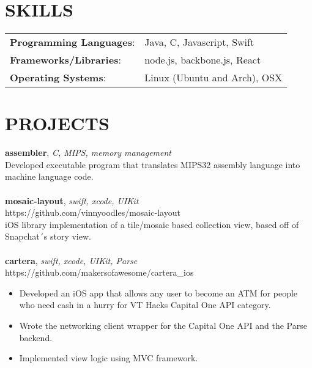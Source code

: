 \documentclass[line,margin]{res}
\begin{document}
\begin{resume}
	\section{SKILLS}
	\begin{tabular}{@{}ll}
		\textbf{Programming Languages}: & Java, C, Javascript, Swift   \\
		\textbf{Frameworks/Libraries}:  & node.js, backbone.js, React  \\
		\textbf{Operating Systems}:     & Linux (Ubuntu and Arch), OSX \\
	\end{tabular}
	\section{PROJECTS}
	\textbf{assembler}, {\sl C, MIPS, memory management}\\ Developed executable program that translates MIPS32 assembly language into machine language code.\\\\
	\textbf{mosaic-layout}, {\sl swift, xcode, UIKit}\\ https://github.com/vinnyoodles/mosaic-layout\\iOS library implementation of a tile/mosaic based collection view, based off of Snapchat´s story view.\\\\
	\textbf{cartera}, {\sl swift, xcode, UIKit, Parse}\\ https://github.com/makersofawesome/cartera\_ios\\\begin{itemize} \itemsep 1pt
	\item Developed an iOS app that allows any user to become an ATM for people who need cash in a hurry for VT Hacks Capital One API category. 
	\item Wrote the networking client wrapper for the Capital One API and the Parse backend. 
	\item Implemented view logic using MVC framework.
	\end{itemize}
	          
	\ 
\end{resume}
\end{document}
